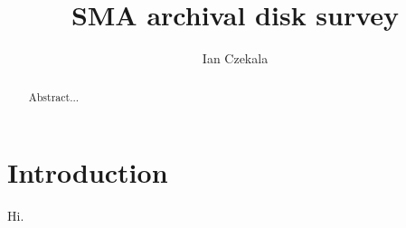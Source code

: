 \documentclass[iop,floatfix,numberedappendix,twocolappendix]{emulateapj}
\begin{document}
\title{SMA archival disk survey}
\author{Ian Czekala}

\begin{abstract}
Abstract...
\end{abstract}

\section{Introduction}

Hi.
\end{document}
